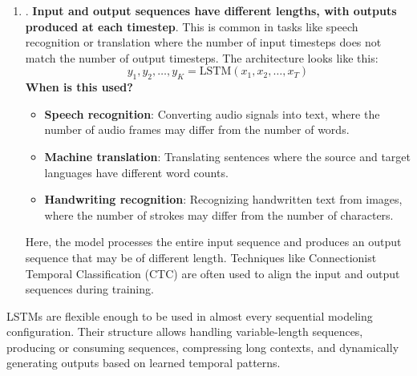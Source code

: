 \begin{enumerate}
    \item {}. \textbf{Input and output sequences have different lengths, with outputs produced at each timestep}. This is common in tasks like speech recognition or translation where the number of input timesteps does not match the number of output timesteps. The architecture looks like this:
    \begin{equation*}
        y_1, y_2, \ldots, y_{K} = \text{LSTM}\left(x_1, x_2, \ldots, x_T\right)
    \end{equation*}
    \textcolor{Green3}{ \textbf{When is this used?}}
    \begin{itemize}
        \item \textbf{Speech recognition}: Converting audio signals into text, where the number of audio frames may differ from the number of words.
        \item \textbf{Machine translation}: Translating sentences where the source and target languages have different word counts.
        \item \textbf{Handwriting recognition}: Recognizing handwritten text from images, where the number of strokes may differ from the number of characters.
    \end{itemize}
    Here, the model processes the entire input sequence and produces an output sequence that may be of different length. Techniques like Connectionist Temporal Classification (CTC) are often used to align the input and output sequences during training.
\end{enumerate}
LSTMs are flexible enough to be used in almost every sequential modeling configuration. Their structure allows handling variable-length sequences, producing or consuming sequences, compressing long contexts, and dynamically generating outputs based on learned temporal patterns.